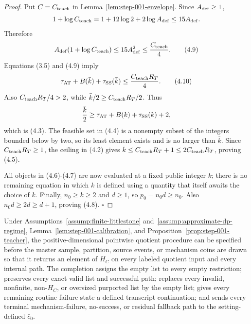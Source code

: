 \begin{proof}
Put \(C=C_{\rm teach}\) in
Lemma~\ref{lem:step-001-envelope}. Since \(A_{\rm def}\ge1\),
\[
1+\log C_{\rm teach}
=1+12\log2+2\log A_{\rm def}
\le15A_{\rm def}.
\]
Therefore
\[
A_{\rm def}(1+\log C_{\rm teach})
\le15A_{\rm def}^2
\le\frac{C_{\rm teach}}4.
\tag{4.9}
\]
Equations (3.5) and (4.9) imply
\[
\tau_{\rm AT}+B(\bar k)+\tau_{\rm SS}(\bar k)
\le\frac{C_{\rm teach}R_T}{4}.
\tag{4.10}
\]
Also \(C_{\rm teach}R_T/4>2\), while
\(\bar k/2\ge C_{\rm teach}R_T/2\). Thus
\[
\frac{\bar k}{2}
\ge\tau_{\rm AT}+B(\bar k)+\tau_{\rm SS}(\bar k)+2,
\]
which is (4.3). The feasible set in (4.4) is a nonempty subset of the
integers bounded below by two, so its least element exists and is no larger
than \(\bar k\). Since \(C_{\rm teach}R_T\ge1\), the ceiling in (4.2) gives
\(\bar k\le C_{\rm teach}R_T+1\le2C_{\rm teach}R_T\), proving (4.5).

All objects in (4.6)-(4.7) are now evaluated at a fixed public integer
\(k\); there is no remaining equation in which \(k\) is defined using a
quantity that itself awaits the choice of \(k\). Finally, \(n_0\ge k\ge2\)
and \(d\ge1\), so \(p_0=n_0d\ge n_0\). Also
\(n_0d\ge2d\ge d+1\), proving (4.8). \(\square\)


\end{proof}

\begin{proposition}\label{prop:step-001-totalization}
Under Assumptions~\ref{assump:finite-littlestone}
and~\ref{assump:approximate-dp-regime},
Lemma~\ref{lem:step-001-calibration}, and
Proposition~\ref{prop:step-001-teacher}, the positive-dimensional
pointwise quotient procedure can be specified before the master sample,
partition, source events, or mechanism coins are drawn so that it returns an
element of \(H_C\) on every labeled quotient input and every internal path.
The completion assigns the empty list to every empty restriction; preserves
every exact valid list and successful path; replaces every invalid,
nonfinite, non-\(H_C\), or oversized purported list by the empty list; gives
every remaining routine-failure state a defined transcript continuation; and
sends every terminal mechanism-failure, no-success, or residual fallback
path to the setting-defined \(\bar c_0\).


\end{proposition}


